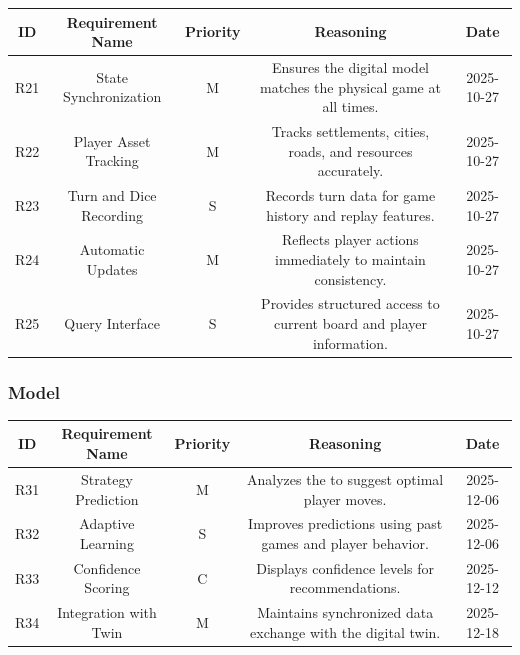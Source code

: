 \documentclass{article}
\begin{document}
\begin{tabular}{|c|c|c|c|c|}
\hline
\textbf{ID} & \textbf{Requirement Name} & \textbf{Priority} &
\textbf{Reasoning} & \textbf{Date} \\
\hline
R21 & State Synchronization & M &
\parbox[t]{4cm}{Ensures the digital model matches the physical game
at all times.} &
2025-10-27 \\
\hline
R22 & Player Asset Tracking & M &
\parbox[t]{4cm}{Tracks settlements, cities, roads, and resources
accurately.} &
2025-10-27 \\
\hline
R23 & Turn and Dice Recording & S &
\parbox[t]{4cm}{Records turn data for game history and replay
features.} &
2025-10-27 \\
\hline
R24 & Automatic Updates & M &
\parbox[t]{4cm}{Reflects player actions immediately to maintain
consistency.} &
2025-10-27 \\
\hline
R25 & Query Interface & S &
\parbox[t]{4cm}{Provides structured access to current board and
player information.} &
2025-10-27 \\
\hline
\end{tabular}

\vspace{1em}

\subsubsection*{\AI{} Model}

\begin{tabular}{|c|c|c|c|c|}
\hline
\textbf{ID} & \textbf{Requirement Name} & \textbf{Priority} &
\textbf{Reasoning} & \textbf{Date} \\
\hline
R31 & Strategy Prediction & M &
\parbox[t]{4cm}{Analyzes the \GameState{} to suggest optimal player
moves.} &
2025-12-06 \\
\hline
R32 & Adaptive Learning & S &
\parbox[t]{4cm}{Improves predictions using past games and player
behavior.} &
2025-12-06 \\
\hline
R33 & Confidence Scoring & C &
\parbox[t]{4cm}{Displays confidence levels for \AI{} recommendations.} &
2025-12-12 \\
\hline
R34 & Integration with Twin & M &
\parbox[t]{4cm}{Maintains synchronized data exchange with the digital
twin.} &
2025-12-18 \\
\hline

\end{tabular}

\vspace{1em}
\end{document}
